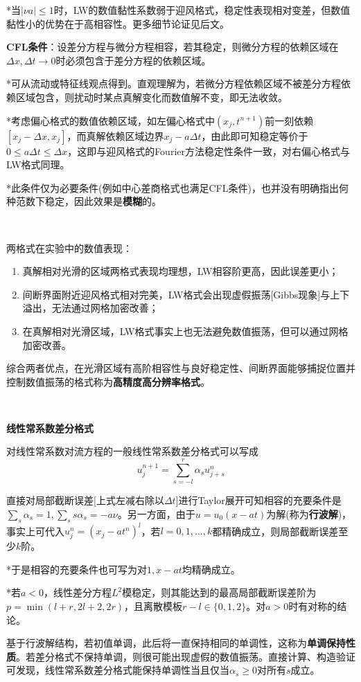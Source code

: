 \documentclass[a4paper,UTF8,fontset=windows]{ctexart}
\begin{document}
*当$|\nu a|\le1$时，LW的数值黏性系数弱于迎风格式，稳定性表现相对变差，但数值黏性小的优势在于高相容性。更多细节论证见后文。

\textbf{CFL条件}：设差分方程与微分方程相容，若其稳定，则微分方程的依赖区域在$\Delta x,\Delta t\to0$时必须包含于差分方程的依赖区域。

*可从流动或特征线观点得到。直观理解为，若微分方程依赖区域不被差分方程依赖区域包含，则扰动时某点真解变化而数值解不变，即无法收敛。

*考虑偏心格式的数值依赖区域，如左偏心格式中$(x_j,t^{n+1})$前一刻依赖$[x_j-\Delta x,x_j]$，而真解依赖区域边界$x_j-a\Delta t$，由此即可知稳定等价于$0\le a\Delta t\le\Delta x$，这即与迎风格式的Fourier方法稳定性条件一致，对右偏心格式与LW格式同理。

*此条件仅为必要条件(例如中心差商格式也满足CFL条件)，也并没有明确指出何种范数下稳定，因此效果是\textbf{模糊}的。

\

两格式在实验中的数值表现：
\begin{enumerate}
    \item 真解相对光滑的区域两格式表现均理想，LW相容阶更高，因此误差更小；
    \item 间断界面附近迎风格式相对完美，LW格式会出现虚假振荡[Gibbs现象]与上下溢出，无法通过网格加密改善；
    \item 在真解相对光滑区域，LW格式事实上也无法避免数值振荡，但可以通过网格加密改善。
\end{enumerate}
综合两者优点，在光滑区域有高阶相容性与良好稳定性、间断界面能够捕捉位置并控制数值振荡的格式称为\textbf{高精度高分辨率格式}。

\

\textbf{线性常系数差分格式}

对线性常系数对流方程的一般线性常系数差分格式可以写成
$$u_j^{n+1}=\sum_{s=-l}^r\alpha_su_{j+s}^n$$

直接对局部截断误差[上式左减右除以$\Delta t$]进行Taylor展开可知相容的充要条件是$\sum_s\alpha_s=1,\sum_ss\alpha_s=-a\nu$。另一方面，由于$u=u_0(x-at)$为解(称为\textbf{行波解})，事实上可代入$u_j^n=(x_j-at^n)^l$，若$l=0,1,\dots,k$都精确成立，则局部截断误差至少$k$阶。

*于是相容的充要条件也可写为对$1,x-at$均精确成立。

*若$a<0$，线性差分方程$L^2$模稳定，则其能达到的最高局部截断误差阶为$p=\min(l+r,2l+2,2r)$，且离散模板$r-l\in\{0,1,2\}$。对$a>0$时有对称的结论。


基于行波解结构，若初值单调，此后将一直保持相同的单调性，这称为\textbf{单调保持性质}。若差分格式不保持单调，则很可能出现虚假的数值振荡。直接计算、构造验证可发现，线性常系数差分格式能保持单调性当且仅当$\alpha_s\ge0$对所有$s$成立。
\end{document}
